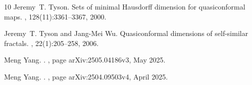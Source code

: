 \documentclass[11pt,a4paper]{article}
\numberwithin{equation}{section}
\theoremstyle{plain}
\theoremstyle{definition}
\begin{document}
\begin{thebibliography}{10}
Jeremy~T. Tyson.
\newblock Sets of minimal {H}ausdorff dimension for quasiconformal maps.
, 128(11):3361--3367, 2000.

Jeremy~T. Tyson and Jang-Mei Wu.
\newblock Quasiconformal dimensions of self-similar fractals.
, 22(1):205--258, 2006.

Meng {Yang}.
.
, page arXiv:2505.04186v3, May 2025.

Meng {Yang}.
.
, page arXiv:2504.09503v4, April 2025.

\end{thebibliography}
\end{document}

